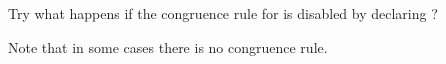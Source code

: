 \begin{isabellebody}
\begin{isamarkuptext}
  \begin{exercise}
  Try what happens if the congruence rule for  is
  disabled by declaring ?
  \end{exercise}

  Note that in some cases there is no  congruence rule.
  \fixme{}%
\end{isamarkuptext}%
\isamarkuptrue%
%
\isadelimtheory
%
\endisadelimtheory
%
\isatagtheory
{}\isamarkupfalse%
%
\endisatagtheory
{\isafoldtheory}%
%
\isadelimtheory
%
\endisadelimtheory
\isanewline
\end{isabellebody}%
